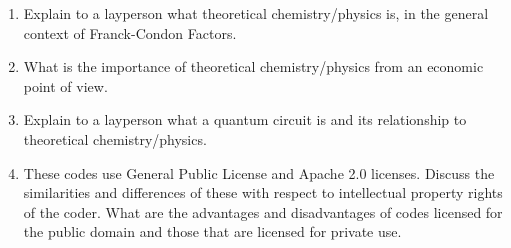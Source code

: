 \documentclass[12pt]{article}
\begin{document}
\begin{enumerate}
    \item Explain to a layperson what theoretical chemistry/physics is, in the general context of Franck-Condon Factors.
    \item What is the importance of theoretical chemistry/physics from an economic point of view.
    \item Explain to a layperson what a quantum circuit is and its relationship to theoretical chemistry/physics.
    \item These codes use General Public License and Apache 2.0 licenses. Discuss the similarities and differences of these with respect to intellectual property rights of the coder. What are the advantages and disadvantages of codes licensed for the public domain and those that are licensed for private use.
\end{enumerate}

\newpage



\end{document}
